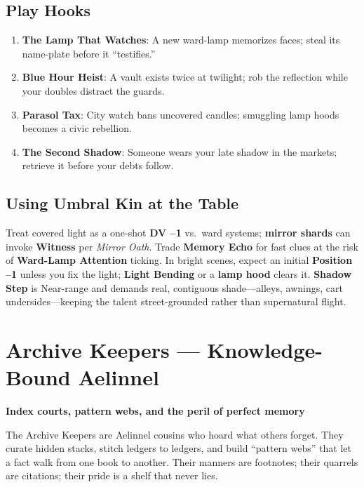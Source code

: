 \documentclass[11pt]{book}
\begin{document}
\subsection*{Play Hooks}
\begin{enumerate}
    \item \textbf{The Lamp That Watches}: A new ward-lamp memorizes faces; steal its name-plate before it ``testifies.''
    \item \textbf{Blue Hour Heist}: A vault exists twice at twilight; rob the reflection while your doubles distract the guards.
    \item \textbf{Parasol Tax}: City watch bans uncovered candles; smuggling lamp hoods becomes a civic rebellion.
    \item \textbf{The Second Shadow}: Someone wears your late shadow in the markets; retrieve it before your debts follow.
\end{enumerate}

\subsection*{Using Umbral Kin at the Table}
Treat covered light as a one-shot \textbf{DV --1} vs.\ ward systems; \textbf{mirror shards} can invoke \textbf{Witness} per \emph{Mirror Oath}. Trade \textbf{Memory Echo} for fast clues at the risk of \textbf{Ward-Lamp Attention} ticking. In bright scenes, expect an initial \textbf{Position --1} unless you fix the light; \textbf{Light Bending} or a \textbf{lamp hood} clears it. \textbf{Shadow Step} is Near-range and demands real, contiguous shade---alleys, awnings, cart undersides---keeping the talent street-grounded rather than supernatural flight.

\section{Archive Keepers --- Knowledge-Bound Aelinnel}
\textbf{Index courts, pattern webs, and the peril of perfect memory}

The Archive Keepers are Aelinnel cousins who hoard what others forget. They curate hidden stacks, stitch ledgers to ledgers, and build ``pattern webs'' that let a fact walk from one book to another. Their manners are footnotes; their quarrels are citations; their pride is a shelf that never lies.
\end{document}
